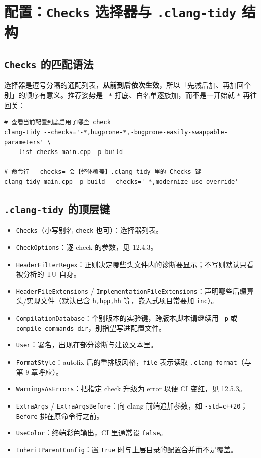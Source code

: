 \documentclass[12pt,a4paper,fontset=fandol]{ctexbook}
\newcommand{\Opt}[1]{\texttt{-\/-#1}}
\newcommand{\Bk}{\discretionary{}{}{}}
\begin{document}
\section{配置：\texttt{Checks} 选择器与 \texttt{.clang-tidy} 结构}\label{sec:ch12-s4}
\subsection{\texttt{Checks} 的匹配语法}\label{sec:ch12-s4a}
选择器是逗号分隔的通配列表，\textbf{从前到后依次生效}，所以「先减后加、再加回个别」的顺序有意义。推荐姿势是 \texttt{-*} 打底、白名单逐族加，而不是一开始就 \texttt{*} 再往回关：
\begin{lstlisting}[style=shellstyle,caption={选择器与 \Opt{list-checks} 的正确用法},label={lst:ch12-checks}]
# 查看当前配置到底启用了哪些 check
clang-tidy --checks='-*,bugprone-*,-bugprone-easily-swappable-parameters' \
  --list-checks main.cpp -p build

# 命令行 --checks= 会【整体覆盖】.clang-tidy 里的 Checks 键
clang-tidy main.cpp -p build --checks='-*,modernize-use-override'
\end{lstlisting}
\subsection{\texttt{.clang-tidy} 的顶层键}\label{sec:ch12-s4b}
\begin{itemize}
\item \texttt{Checks}（小写别名 \texttt{check} 也可）：选择器列表。
\item \texttt{CheckOptions}：逐 check 的参数，见 12.4.3。
\item \texttt{HeaderFilterRegex}：正则决定哪些头文件内的诊断要显示；不写则默认只看被分析的 TU 自身。
\item \texttt{HeaderFileExtensions} / \texttt{ImplementationFileExtensions}：声明哪些后缀算头/实现文件（默认已含 \texttt{h,hpp,hh} 等，嵌入式项目常要加 \texttt{inc}）。
\item \texttt{Compilation{\Bk}Database}：个别版本的实验键，跨版本脚本请继续用 \texttt{-p} 或 \Opt{compile-{\Bk}commands-{\Bk}dir}，别指望写进配置文件。
\item \texttt{User}：署名，出现在部分诊断与建议文本里。
\item \texttt{FormatStyle}：autofix 后的重排版风格，\texttt{file} 表示读取 \texttt{.clang-format}（与第 9 章呼应）。
\item \texttt{WarningsAsErrors}：把指定 check 升级为 error 以便 CI 变红，见 12.5.3。
\item \texttt{ExtraArgs} / \texttt{ExtraArgsBefore}：向 clang 前端追加参数，如 \texttt{-std=c++20}；\texttt{Before} 排在原命令行之前。
\item \texttt{UseColor}：终端彩色输出，CI 里通常设 \texttt{false}。
\item \texttt{InheritParentConfig}：置 \texttt{true} 时与上层目录的配置合并而不是覆盖。
\end{itemize}
\end{document}

